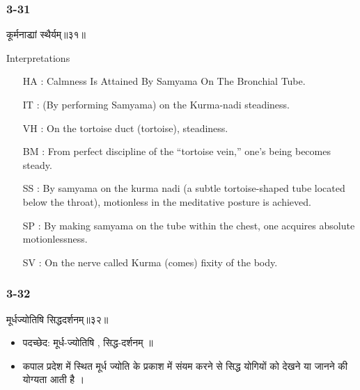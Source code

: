 \begin{frame}[fragile]\frametitle{3-31}
\begin{sanskrit}
कूर्मनाड्यां स्थैर्यम्॥३१॥
\end{sanskrit}

Interpretations
\begin{itemize}	
\item [HA]: Calmness Is Attained By Samyama On The Bronchial Tube.
\item [IT]: (By performing Samyama) on the Kurma-nadi steadiness.
\item [VH]: On the tortoise duct (tortoise), steadiness.
\item [BM]: From perfect discipline of the “tortoise vein,” one’s being becomes steady.
\item [SS]: By samyama on the kurma nadi (a subtle tortoise-shaped tube located below the throat), motionless in the meditative posture is achieved.
\item [SP]: By making samyama on the tube within the chest, one acquires absolute motionlessness.
\item [SV]: On the nerve called Kurma (comes) fixity of the body. 
\end{itemize}
\end{frame}


\begin{frame}[fragile]\frametitle{3-32}
\begin{sanskrit}
मूर्धज्योतिषि सिद्धदर्शनम्॥३२॥
\end{sanskrit}

\begin{itemize}
\item पदच्छेद:  मूर्ध-ज्योतिषि , सिद्ध-दर्शनम् ॥
\item कपाल प्रदेश में स्थित मूर्ध ज्योति के प्रकाश में संयम करने से सिद्ध योगियों को देखने या जानने की योग्यता आती है ।
\end{itemize}
\end{frame}



